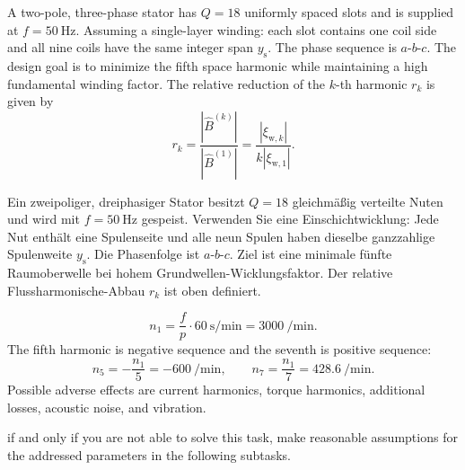 
A two-pole, three-phase stator has $Q=18$ uniformly spaced slots and is supplied at $f=\SI{50}{\hertz}$. Assuming a single-layer winding: each slot contains one coil side and all nine coils have the same integer span $y_{\mathrm{s}}$. The phase sequence is $a$-$b$-$c$. The design goal is to minimize the fifth space harmonic while maintaining a high fundamental winding factor. The relative reduction of the $k$-th harmonic $r_k$ is given by
$$
	r_k=\frac{|\hat B^{(k)}|}{|\hat B^{(1)}|}
	=\frac{|\xi_{\mathrm{w},k}|}{k|\xi_{\mathrm{w},1}|}.
$$

\begin{germanblock}
	Ein zweipoliger, dreiphasiger Stator besitzt $Q=18$ gleichmäßig verteilte Nuten und wird mit $f=\SI{50}{\hertz}$ gespeist. Verwenden Sie eine Einschichtwicklung: Jede Nut enthält eine Spulenseite und alle neun Spulen haben dieselbe ganzzahlige Spulenweite $y_{\mathrm{s}}$. Die Phasenfolge ist $a$-$b$-$c$.  Ziel ist eine minimale fünfte Raumoberwelle bei hohem Grundwellen-Wicklungsfaktor. Der relative Flussharmonische-Abbau $r_k$ ist oben definiert.
\end{germanblock}


\begin{solutionblock}
	\[
		n_1=\frac{f}{p}\cdot\SI{60}{\second\per\minute}=\SI{3000}{\per\minute}.
	\]
	The fifth harmonic is negative sequence and the seventh is positive sequence:
	\[
		n_5=-\frac{n_1}{5}=\SI{-600}{\per\minute},
		\qquad
		n_7=\frac{n_1}{7}=\SI{428.6}{\per\minute}.
	\]
	Possible adverse effects are current harmonics, torque harmonics, additional losses, acoustic noise, and vibration.
\end{solutionblock}

\begin{hintblock}
	if and only if you are not able to solve this task, make reasonable assumptions for the addressed parameters in the following subtasks.
\end{hintblock}

